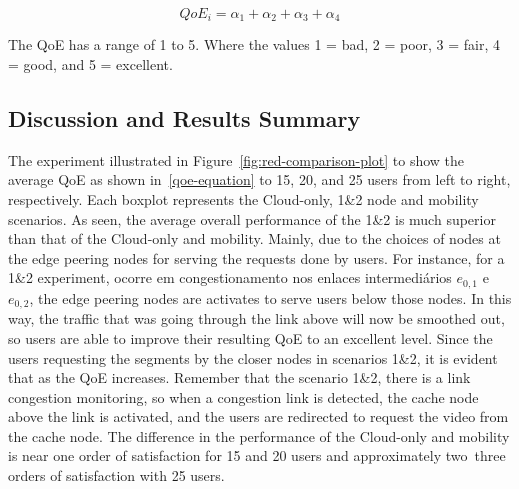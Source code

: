 \begin{equation}\label{eq:qoe-equation}
QoE_i = \alpha_1 + \alpha_2 + \alpha_3 + \alpha_4
\end{equation}

The QoE has a range of 1 to 5. Where the values 1 = bad, 2 = poor, 3 = fair, 4 = good, and 5 = excellent.



\subsection{Discussion and Results Summary}


The experiment illustrated in Figure~\ref{fig:red-comparison-plot} to show the average QoE as shown in~\ref{qoe-equation} to 15, 20, and 25 users from left to right, respectively. Each boxplot represents the Cloud-only, 1\&2 node and mobility scenarios. As seen, the average overall performance of the 1\&2 is much superior than that of the Cloud-only and mobility. Mainly, due to the choices of nodes at the edge peering nodes for serving the requests done by users. 
%
For instance, for a 1\&2 experiment, ocorre em congestionamento nos enlaces intermediários $e_{0,1}$ e $e_{0,2}$, 
the edge peering nodes are activates to serve users below those nodes. In this way, the traffic that was going through the link above will now be smoothed out, so users are able to improve their resulting QoE to an excellent level.
%
Since the users requesting the segments by the closer nodes in scenarios 1\&2, it is
evident that as the QoE increases. Remember that the scenario 1\&2, there is a link congestion monitoring, so when a congestion link is detected, the cache node above the link is activated, and the users are redirected to request the video from the cache node.
%
The difference in the performance of the Cloud-only and mobility is near one order of satisfaction for 15 and 20 users and approximately two~three orders of satisfaction with 25 users. 

